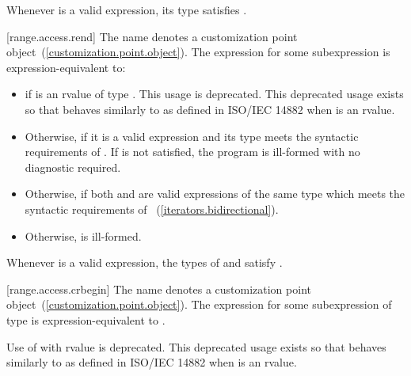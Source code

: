 \pnum
\enternote Whenever  is a valid expression, its
type satisfies . \exitnote

[range.access.rend]{}
\pnum
The name  denotes a customization point
object~(\ref{customization.point.object}). The expression
 for some subexpression  is expression-equivalent to:

\begin{itemize}
\item
   if  is an rvalue of
  type . This usage is deprecated.
  \enternote This deprecated usage exists so that
   behaves similarly to 
  as defined in ISO/IEC 14882 when  is an rvalue. \exitnote

\item
  Otherwise,  if it is a valid expression and its type  meets the
  syntactic requirements of
  . If
   is not satisfied, the program is ill-formed with
  no diagnostic required.

\item
  Otherwise,  if both
   and  are valid expressions of the same
  type  which meets the syntactic requirements of
  ~(\ref{iterators.bidirectional}).

\item
  Otherwise,  is ill-formed.
\end{itemize}

\pnum
\enternote Whenever  is a valid expression, the
types of  and  satisfy
. \exitnote

[range.access.crbegin]{}
\pnum
The name  denotes a customization point
object~(\ref{customization.point.object}). The expression
 for some subexpression  of type 
is expression-equivalent to .

\pnum
Use of  with rvalue  is deprecated.
\enternote This deprecated usage exists so that 
behaves similarly to  as defined in ISO/IEC 14882 when
 is an rvalue. \exitnote

